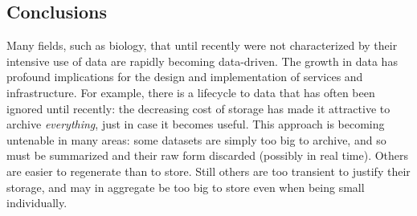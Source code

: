 






\subsection{Conclusions}
\label{sec:conclusion}

Many fields, such as biology, that until recently were not
characterized by their intensive use of data are rapidly becoming
data-driven.  The growth in data has profound implications for the
design and implementation of services and infrastructure.  For
example, there is a lifecycle to data that has often been ignored
until recently: the decreasing cost of storage has made it attractive
to archive \emph{everything}, just in case it becomes useful. This
approach is becoming untenable in many areas: some datasets are simply
too big to archive, and so must be summarized and their raw form
discarded (possibly in real time). Others are easier to regenerate
than to store.  Still others are too transient to justify their
storage, and may in aggregate be too big to store even when being
small individually.

